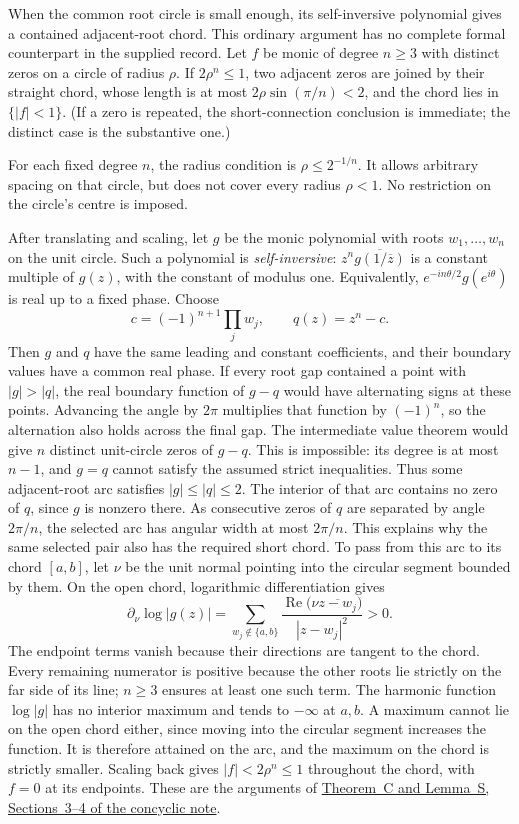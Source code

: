 When the common root circle is small enough, its self-inversive
polynomial gives a contained adjacent-root chord. This ordinary
argument has no complete formal counterpart in the supplied record.
Let $f$ be monic of degree $n\ge3$ with distinct zeros on a circle of radius
$\rho$.  If $2\rho^n\le1$, two adjacent zeros are joined by their straight
chord, whose length is at most $2\rho\sin(\pi/n)<2$, and the chord lies in
$\{|f|<1\}$.  (If a zero is repeated, the short-connection conclusion is
immediate; the distinct case is the substantive one.)

For each fixed degree $n$, the radius condition is $\rho\le2^{-1/n}$.
It allows arbitrary spacing on that circle, but does not cover every
radius $\rho<1$. No restriction on the circle's centre is imposed.

After translating and scaling, let $g$ be the monic polynomial with
roots $w_1,\ldots,w_n$ on the unit circle. Such a polynomial is
\emph{self-inversive}: $z^n\overline{g(1/\overline z)}$
is a constant multiple of $g(z)$, with the constant of modulus one.
Equivalently, $e^{-in\theta/2}g(e^{i\theta})$ is real up to a fixed phase.
Choose
\[
 c=(-1)^{n+1}\prod_j w_j,\qquad q(z)=z^n-c.
\]
Then $g$ and $q$ have the same leading and constant coefficients, and their
boundary values have a common real phase. If every root gap contained a
point with $|g|>|q|$, the real boundary function of $g-q$ would have
alternating signs at these points. Advancing the angle by $2\pi$ multiplies
that function by $(-1)^n$, so the alternation also holds across the final
gap. The intermediate value theorem would give $n$ distinct unit-circle
zeros of $g-q$. This is impossible: its degree is at most $n-1$, and
$g=q$ cannot satisfy the assumed strict inequalities. Thus some
adjacent-root arc satisfies $|g|\le|q|\le2$. The interior of that arc contains no zero of
$q$, since $g$ is nonzero there. As consecutive zeros of $q$ are separated
by angle $2\pi/n$, the selected arc has angular width at most $2\pi/n$.
This explains why the same selected pair also has the required short chord.
To pass from this arc to its chord $[a,b]$, let $\nu$ be the unit
normal pointing into the circular segment bounded by them. On the open
chord, logarithmic differentiation gives
\[
 \partial_\nu\log|g(z)|
 =\sum_{w_j\notin\{a,b\}}
   \frac{\operatorname{Re}\bigl(\nu\overline{z-w_j}\bigr)}{|z-w_j|^2}>0.
\]
The endpoint terms vanish because their directions are tangent to the
chord. Every remaining numerator is positive because the other roots
lie strictly on the far side of its line; $n\ge3$ ensures at least one
such term. The harmonic function $\log|g|$ has no interior maximum and
tends to $-\infty$ at $a,b$. A maximum cannot lie on the open chord
either, since moving into the circular segment increases the function.
It is therefore attained on the arc, and the maximum on the chord is
strictly smaller. Scaling back gives $|f|<2\rho^n\le1$ throughout the
chord, with $f=0$ at its endpoints. These are the arguments of
\href{https://github.com/wcook04/plectis-erdos/blob/f214a6b45528dc5eefe20ffadc35f2e981627d4c/research_corpus/Erdos1041/ConcyclicAlternation.md}{Theorem~C and Lemma~S, Sections~3--4 of the concyclic note}.

